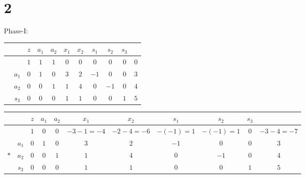 \documentclass[a4paper,12pt]{article}
\begin{document}
\section*{2}
Phase-I:
\begin{table}[H]
    \tiny
    \begin{tabularx}{\textwidth}{cc|cccccccc|c}
         &       & $z$ & $a_1$ & $a_2$ & $x_1$ & $x_2$ & $s_1$ & $s_2$ & $s_3$ &     \\
        \hline
         &       & $1$ & $1$   & $1$   & $0$   & $0$   & $0$   & $0$   & $0$   & $0$ \\
        \hline
         & $a_1$ & $0$ & $1$   & $0$   & $3$   & $2$   & $-1$  & $0$   & $0$   & $3$ \\
         & $a_2$ & $0$ & $0$   & $1$   & $1$   & $4$   & $0$   & $-1$  & $0$   & $4$ \\
         & $s_3$ & $0$ & $0$   & $0$   & $1$   & $1$   & $0$   & $0$   & $1$   & $5$ \\
    \end{tabularx}
\end{table}

\begin{table}[H]
    \tiny
    \begin{tabularx}{\textwidth}{cc|cccccccc|c}
            &       & $z$ & $a_1$ & $a_2$ & $x_1$         & $x_2$         & $s_1$       & $s_2$       & $s_3$ &               \\
        \hline
            &       & $1$ & $0$   & $0$   & $-3 - 1 = -4$ & $-2 - 4 = -6$ & $-(-1) = 1$ & $-(-1) = 1$ & $0$   & $-3 - 4 = -7$ \\
        \hline
            & $a_1$ & $0$ & $1$   & $0$   & $3$           & $2$           & $-1$        & $0$         & $0$   & $3$           \\
        $*$ & $a_2$ & $0$ & $0$   & $1$   & $1$           & $4$           & $0$         & $-1$        & $0$   & $4$           \\
            & $s_3$ & $0$ & $0$   & $0$   & $1$           & $1$           & $0$         & $0$         & $1$   & $5$           \\
    \end{tabularx}
\end{table}
\end{document}
